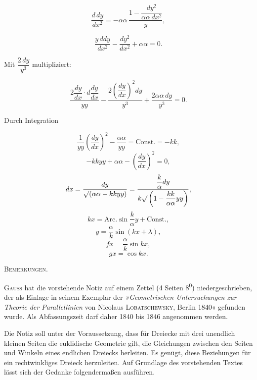 %
\[
\frac{d\,dy}{dx^{2}} = -\alpha\alpha\,\frac{1-\dfrac{dy^{2}}{\alpha\alpha\,dx^{2}}}{y},
\]

\[
\frac{y\,ddy}{dx^{2}} - \frac{dy^{2}}{dx^{2}} + \alpha\alpha = 0.
\]

\noindent Mit $\dfrac{2\,dy}{y^{3}}$ multipliziert:

\[
\frac{2\dfrac{dy}{dx}\cdot d\dfrac{dy}{dx}}{yy} - \frac{2\left(\dfrac{dy}{dx}\right)^{2}dy}{y^{3}} + \frac{2\alpha\alpha\,dy}{y^{3}} = 0.
\]

\noindent Durch Integration

\[
\frac{1}{yy}\left(\frac{dy}{dx}\right)^{2} - \frac{\alpha\alpha}{yy} = \text{Const.} = -kk,
\]
\[
-kkyy + \alpha\alpha - \left(\frac{dy}{dx}\right)^{2} = 0,
\]
\[
dx = \frac{dy}{\mathord{\surd}(\alpha\alpha-kkyy)} = \frac{\dfrac{k}{\alpha}dy}{k\mathord{\surd}\left(1-\dfrac{kk}{\alpha\alpha}yy\right)},
\]
\[
kx = \text{Arc.}\sin\frac{k}{\alpha}y + \text{Const.},
\]
\[
y = \frac{\alpha}{k}\sin(kx+\lambda),
\]
\[
fx = \frac{\alpha}{k}\sin kx,
\]
\[
gx = \cos kx.
\]

\smallskip
\begin{center}

\end{center}

\begin{center}
\textsc{Bemerkungen.}
\end{center}

\noindent \textsc{Gauss} hat die vorstehende Notiz auf einem Zettel (4 Seiten 8\textsuperscript{0}) niedergeschrieben, der als Einlage in seinem Exemplar der \emph{»Geometrischen Untersuchungen zur Theorie der Parallellinien} von Nicolaus \textsc{Lobatschewsky}, Berlin 1840« gefunden wurde. Als Abfassungszeit darf daher 1840 bis 1846 angenommen werden.

Die Notiz soll unter der Voraussetzung, dass für Dreiecke mit drei unendlich kleinen Seiten die euklidische Geometrie gilt, die Gleichungen zwischen den Seiten und Winkeln eines endlichen Dreiecks herleiten. Es genügt, diese Beziehungen für ein rechtwinkliges Dreieck herzuleiten. Auf Grundlage des vorstehenden Textes lässt sich der Gedanke folgendermaßen ausführen.
